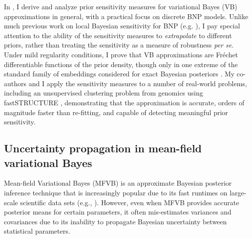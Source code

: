 In \citet{giordano:2021:bnpsensitivity}, I derive and analyze prior sensitivity
measures for variational Bayes (VB) approximations in general, with a practical
focus on discrete BNP models. Unlike much previous work on local Bayesian
sensitivity for BNP (e.g. \citet{Basu:2000:BNP_robustness}), I pay special
attention to the ability of the sensitivity measures to \emph{extrapolate} to
different priors, rather than treating the sensitivity as a measure of
robustness \textit{per se}. Under mild regularity conditions, I prove that VB
approximations are Fr{\'e}chet differentiable functions of the prior density,
though only in one extreme of the standard family of embeddings considered for
exact Bayesian posteriors \citep{gustafson:1996:localposterior}.
My co-authors and I apply the sensitivity measures to a number of real-world
problems, including an unsupervised clustering problem from genomics using
fastSTRUCTURE \citep{raj:2014:faststructure}, demonstrating that the
approximation is accurate, orders of magnitude faster than re-fitting, and
capable of detecting meaningful prior sensitivity.

\subsection*{Uncertainty propagation in mean-field variational Bayes}

Mean-field Variational Bayes (MFVB) is an approximate Bayesian posterior
inference technique that is increasingly popular due to its fast runtimes on
large-scale scientific data sets (e.g., \citet{raj:2014:faststructure,
kucukelbir:2017:advi, regier:2019:cataloging}). However, even when MFVB provides
accurate posterior means for certain parameters, it often mis-estimates
variances and covariances \citep{wang:2005:inadequacy, turner:2011:two} due to
its inability to propagate Bayesian uncertainty between statistical parameters.

